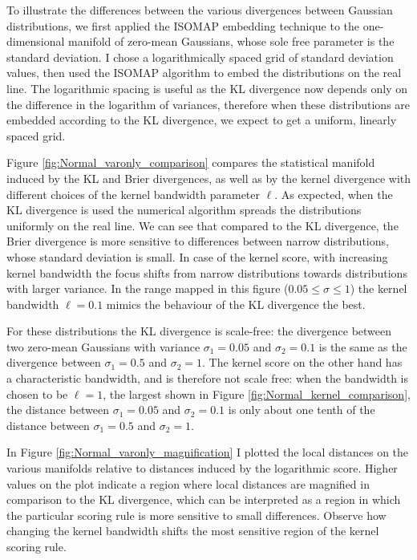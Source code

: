 To illustrate the differences between the various divergences between Gaussian distributions, we first applied the ISOMAP embedding technique to the one-dimensional manifold of zero-mean Gaussians, whose sole free parameter is the standard deviation. I chose a logarithmically spaced grid of standard deviation values, then used the ISOMAP algorithm to embed the distributions on the real line. The logarithmic spacing is useful as the KL divergence now depends only on the difference in the logarithm of variances, therefore when these distributions are embedded according to the KL divergence, we expect to get a uniform, linearly spaced grid.

Figure \ref{fig:Normal_varonly_comparison} compares the statistical manifold induced by the KL and Brier divergences, as well as by the kernel divergence with different choices of the kernel bandwidth parameter $\ell$. As expected, when the KL divergence is used the numerical algorithm spreads the distributions uniformly on the real line. We can see that compared to the KL divergence, the Brier divergence is more sensitive to differences between narrow distributions, whose standard deviation is small. In case of the kernel score, with increasing kernel bandwidth the focus shifts from narrow distributions towards distributions with larger variance. In the range mapped in this figure ($0.05 \leq \sigma \leq 1$) the kernel bandwidth $\ell=0.1$ mimics the behaviour of the KL divergence the best.

For these distributions the KL divergence is scale-free: the divergence between two zero-mean Gaussians with variance $\sigma_1=0.05$ and $\sigma_2 = 0.1$ is the same as the divergence between $\sigma_1=0.5$ and $\sigma_2 = 1$. The kernel score on the other hand has a characteristic bandwidth, and is therefore not scale free: when the bandwidth is chosen to be $\ell=1$, the largest shown in Figure \ref{fig:Normal_kernel_comparison}, the distance between $\sigma_1=0.05$ and $\sigma_2 = 0.1$ is only about one tenth of the distance between $\sigma_1=0.5$ and $\sigma_2 = 1$.

In Figure \ref{fig:Normal_varonly_magnification} I plotted the local distances on the various manifolds relative to distances induced by the logarithmic score. Higher values on the plot indicate a region where local distances are magnified in comparison to the KL divergence, which can be interpreted as a region in which the particular scoring rule is more sensitive to small differences. Observe how changing the kernel bandwidth shifts the most sensitive region of the kernel scoring rule.

